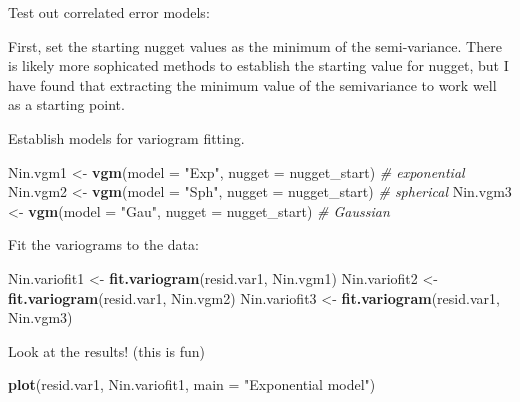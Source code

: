 \documentclass[]{book}
\newenvironment{Shaded}{\begin{snugshade}}{\end{snugshade}}
\newcommand{\CommentTok}[1]{\textcolor[rgb]{0.56,0.35,0.01}{\textit{#1}}}
\newcommand{\DataTypeTok}[1]{\textcolor[rgb]{0.13,0.29,0.53}{#1}}
\newcommand{\KeywordTok}[1]{\textcolor[rgb]{0.13,0.29,0.53}{\textbf{#1}}}
\newcommand{\NormalTok}[1]{#1}
\newcommand{\OperatorTok}[1]{\textcolor[rgb]{0.81,0.36,0.00}{\textbf{#1}}}
\newcommand{\StringTok}[1]{\textcolor[rgb]{0.31,0.60,0.02}{#1}}
\begin{document}
Test out correlated error models:

First, set the starting nugget values as the minimum of the semi-variance. There is likely more sophicated methods to establish the starting value for nugget, but I have found that extracting the minimum value of the semivariance to work well as a starting point.

\begin{Shaded}
\end{Shaded}

Establish models for variogram fitting.

\begin{Shaded}
\begin{Highlighting}[]
\NormalTok{Nin.vgm1 <-}\StringTok{ }\KeywordTok{vgm}\NormalTok{(}\DataTypeTok{model =} \StringTok{"Exp"}\NormalTok{, }\DataTypeTok{nugget =}\NormalTok{ nugget_start) }\CommentTok{# exponential}
\NormalTok{Nin.vgm2 <-}\StringTok{ }\KeywordTok{vgm}\NormalTok{(}\DataTypeTok{model =} \StringTok{"Sph"}\NormalTok{, }\DataTypeTok{nugget =}\NormalTok{ nugget_start) }\CommentTok{# spherical}
\NormalTok{Nin.vgm3 <-}\StringTok{ }\KeywordTok{vgm}\NormalTok{(}\DataTypeTok{model =} \StringTok{"Gau"}\NormalTok{, }\DataTypeTok{nugget =}\NormalTok{ nugget_start) }\CommentTok{# Gaussian}
\end{Highlighting}
\end{Shaded}

Fit the variograms to the data:

\begin{Shaded}
\begin{Highlighting}[]
\NormalTok{Nin.variofit1 <-}\StringTok{ }\KeywordTok{fit.variogram}\NormalTok{(resid.var1, Nin.vgm1)}
\NormalTok{Nin.variofit2 <-}\StringTok{ }\KeywordTok{fit.variogram}\NormalTok{(resid.var1, Nin.vgm2)}
\NormalTok{Nin.variofit3 <-}\StringTok{ }\KeywordTok{fit.variogram}\NormalTok{(resid.var1, Nin.vgm3)}
\end{Highlighting}
\end{Shaded}

Look at the results! (this is fun)

\begin{Shaded}
\begin{Highlighting}[]
\KeywordTok{plot}\NormalTok{(resid.var1, Nin.variofit1, }\DataTypeTok{main =} \StringTok{"Exponential model"}\NormalTok{)}
\end{Highlighting}
\end{Shaded}
\end{document}
